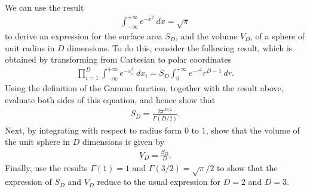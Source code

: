 \begin{question}{1.18}
	We can use the result 
	\begin{align*}
		\int_{-\infty}^{+\infty} e^{-x^2}\ dx = \sqrt{\pi}
	\end{align*}
	to derive an expression for the surface area $S_D$, and the volume $V_D$, of a sphere of unit radius in $D$ dimensions. To do this, consider the following result, which is obtained by transforming from Cartesian to polar coordinates
	\begin{align*}
		\prod_{i = 1}^{D} \int_{-\infty}^{+\infty} e^{-x_i^2}\ dx_i = S_D \int_{0}^{+\infty} e^{-r^2} r^{D-1}\ dr.
	\end{align*}
	Using the definition of the Gamma function, together with the result above, evaluate both sides of this equation, and hence show that
	\begin{align*}
		S_D = \frac{2\pi^{D/2}}{\Gamma(D/2)}.
	\end{align*}
	Next, by integrating with respect to radius form $0$ to $1$, show that the volume of the unit sphere in $D$ dimensions is given by
	\begin{align*}
		V_D = \frac{S_D}{D}.
	\end{align*}
	Finally, use the results $\Gamma(1) = 1$ and $\Gamma(3/2) = \sqrt{\pi}/2$ to show that the expression of $S_D$ and $V_D$ reduce to the usual expression for $D = 2$ and $D = 3$.
\end{question}

